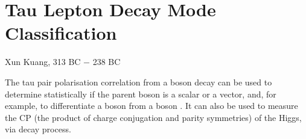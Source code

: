 \chapter{Tau Lepton Decay Mode Classification}
\label{chap:Tau}

%
{Xun Kuang, 313 BC $-$ 238 BC}%

The tau pair polarisation correlation from a boson decay can be used to determine statistically if the parent boson is a  scalar or a vector, and, for example, to differentiate a \PH boson from  a \PZ boson \cite{Bullock:1991my}. It can also be used to measure the CP (the product of charge conjugation and parity symmetries) of the Higgs, via \HiggsToTauTau decay process\cite{Berge:2015nua}.


